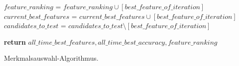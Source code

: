 \begin{algorithm}[H]
{{             
                
        }
         $feature\_ranking$ = $feature\_ranking \cup [best\_feature\_of\_iteration]$ \\
         $current\_best\_features$ = $current\_best\_features \cup [best\_feature\_of\_iteration]$ \\
        $candidates\_to\_test$ = $candidates\_to\_test \setminus [best\_feature\_of\_iteration]$ \\
    }
     \textbf{return} $all\_time\_best\_features, all\_time\_best\_accuracy, feature\_ranking$
    

    \caption{ Merkmalsauswahl-Algorithmus. }
\end{algorithm}
\vspace{0.5cm}